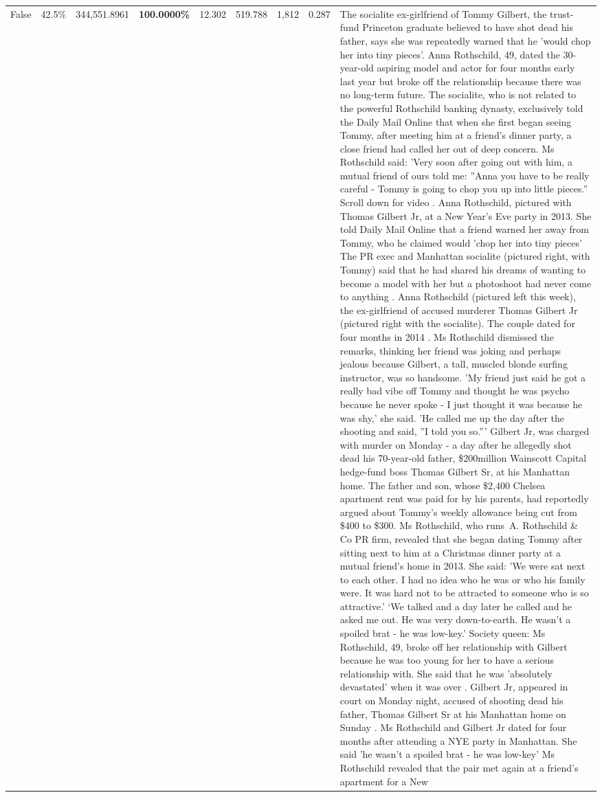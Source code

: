 \begin{table}[H]
\begin{tabular}{lllrlllll}
False & 42.5\% & 344,551.8961 & \bfseries \color{red} 100.0000\% & 12.302 & 519.788 & 1,812 & 0.287 & The socialite ex-girlfriend of Tommy Gilbert, the trust-fund Princeton graduate believed to have shot dead his father, says she was repeatedly warned that he 'would chop her into tiny pieces'. Anna Rothschild, 49, dated the 30-year-old aspiring model and actor for four months early last year but broke off the relationship because there was no long-term future. The socialite, who is not related to the powerful Rothschild banking dynasty, exclusively told the Daily Mail Online that when she first began seeing Tommy, after meeting him at a friend's dinner party, a close friend had called her out of deep concern. Ms Rothschild said: 'Very soon after going out with him, a mutual friend of ours told me: ''Anna you have to be really careful - Tommy is going to chop you up into little pieces.'' Scroll down for video . Anna Rothschild, pictured with Thomas Gilbert Jr, at a New Year's Eve party in 2013. She told Daily Mail Online that a friend warned her away from Tommy, who he claimed would 'chop her into tiny pieces' The PR exec and Manhattan socialite (pictured right, with Tommy) said that he had shared his dreams of wanting to become a model with her but a photoshoot had never come to anything . Anna Rothschild (pictured left this week), the ex-girlfriend of accused murderer Thomas Gilbert Jr (pictured right with the socialite). The couple dated for four months in 2014 . Ms Rothschild dismissed the remarks, thinking her friend was joking and perhaps jealous because Gilbert, a tall, muscled blonde surfing instructor, was so handsome. 'My friend just said he got a really bad vibe off Tommy and thought he was psycho because he never spoke - I just thought it was because he was shy,' she said. 'He called me up the day after the shooting and said, ''I told you so.''' Gilbert Jr, was charged with murder on Monday - a day after he allegedly shot dead his 70-year-old father, \$200million Wainscott Capital hedge-fund boss Thomas Gilbert Sr, at his Manhattan home. The father and son, whose \$2,400 Chelsea apartment rent was paid for by his parents, had reportedly argued about Tommy's weekly allowance being cut from \$400 to \$300. Ms Rothschild, who runs A. Rothschild \& Co PR firm, revealed that she began dating Tommy after sitting next to him at a Christmas dinner party at a mutual friend's home in 2013. She said: 'We were sat next to each other. I had no idea who he was or who his family were. It was hard not to be attracted to someone who is so attractive.' ‘We talked and a day later he called and he asked me out. He was very down-to-earth. He wasn’t a spoiled brat - he was low-key.’ Society queen: Ms Rothschild, 49, broke off her relationship with Gilbert because he was too young for her to have a serious relationship with. She said that he was 'absolutely devastated' when it was over . Gilbert Jr, appeared in court on Monday night, accused of shooting dead his father, Thomas Gilbert Sr at his Manhattan home on Sunday . Ms Rothschild and Gilbert Jr dated for four months after attending a NYE party in Manhattan. She said 'he wasn't a spoiled brat - he was low-key' Ms Rothschild revealed that the pair met again at a friend’s apartment for a New 
\end{tabular}
\end{table}
